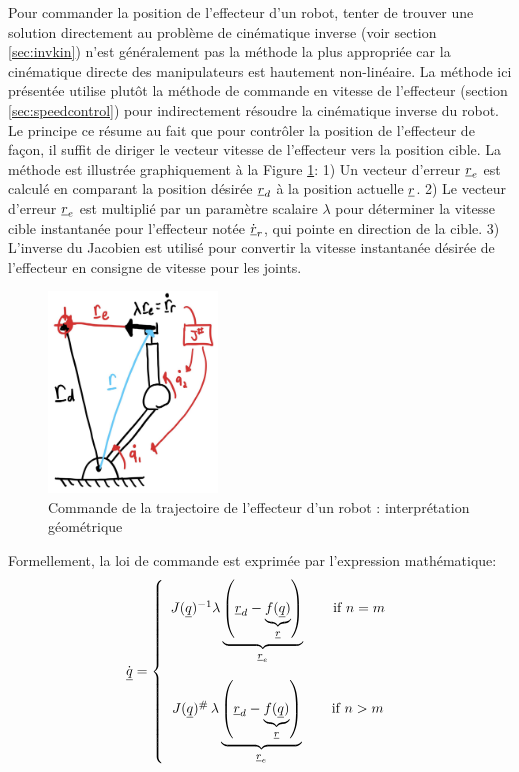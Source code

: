 Pour commander la position de l'effecteur d'un robot, tenter de trouver une solution directement au problème de cinématique inverse (voir section \ref{sec:invkin}) n'est généralement pas la méthode la plus appropriée car la cinématique directe des manipulateurs est hautement non-linéaire. La méthode ici présentée utilise plutôt la méthode de commande en vitesse de l'effecteur (section \ref{sec:speedcontrol}) pour indirectement résoudre la cinématique inverse du robot. Le principe ce résume au fait que pour contrôler la position de l'effecteur de façon, il suffit de diriger le vecteur vitesse de l'effecteur vers la position cible. La méthode est illustrée graphiquement à la Figure \ref{fig:robotspeedcontrolgeo}: 1) Un vecteur d'erreur $\underline{r}_e$ est calculé en comparant la position désirée $\underline{r}_d$ à la position actuelle $\underline{r}$. 2) Le vecteur d'erreur $\underline{r}_e$ est multiplié par un paramètre scalaire $\lambda$ pour déterminer la vitesse cible instantanée pour l'effecteur notée $\dot{\underline{r}}_r$, qui pointe en direction de la cible. 3) L'inverse du Jacobien est utilisé pour convertir la vitesse instantanée désirée de l'effecteur en consigne de vitesse pour les joints. 
\begin{figure}[H]
	\centering
		\includegraphics[width=0.4\textwidth]{fig/robotspeedcontrolgeo.jpg}
	\caption{Commande de la trajectoire de l'effecteur d'un robot : interprétation géométrique}
	\label{fig:robotspeedcontrolgeo}
\end{figure}
Formellement, la loi de commande est exprimée par l'expression mathématique:
\begin{align}
\dot{\underline{q}} = \left\{ \begin{array}{c}
 J(\underline{q})^{-1} \lambda 
 \underbrace{ \left( \underline{r}_d  - \underbrace{f(\underline{q})}_{\underline{r}}  \right) }_{\underline{r}_e} 
 \quad\quad \text{if $n=m$}
 \\ \\
 J(\underline{q})^{\#} \, \lambda  \underbrace{ \left( \underline{r}_d  - \underbrace{f(\underline{q})}_{\underline{r}}  \right) }_{\underline{r}_e}    \quad\quad \text{if $n>m$}
\end{array}
\right.
\end{align}
